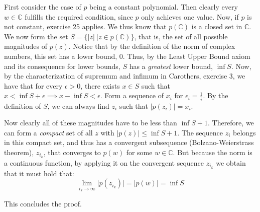 \begin{solution}

    First consider the case of $p$ being a constant polynomial. Then clearly every $w \in \mathbb{C}$ fulfills the required condition, since $p$ only achieves one value. Now, if $p$ is not constant, exercise 25 applies. We thus know that $p(\mathbb{C})$ is a closed set in $\mathbb{C}$. We now form the set $S = \{ \lvert z \rvert \ \rvert z \in p(\mathbb{C})\}$, that is, the set of all possible magnitudes of $p(z)$. Notice that by the definition of the norm of complex numbers, this set has a lower bound, 0. Thus, by the Least Upper Bound axiom and its consequence for lower bounds, $S$ has a \textit{greatest} lower bound, $\inf S$. Now, by the characterization of supremum and infimum in Carothers, exercise 3, we have that for every $\epsilon > 0$, there exists $x \in S$ such that $x < \inf S + \epsilon \implies x- \inf S < \epsilon$. Form a sequence of $x_i$ for $\epsilon_i = \frac{1}{i}$. By the definition of $S$, we can always find $z_i$ such that $\lvert p(z_i) \rvert = x_i$. 
    
    Now clearly all of these magnitudes have to be less than $\inf S + 1$. Therefore, we can form a \textit{compact} set of all $z$ with $\lvert p(z) \rvert \leq \inf S + 1$. The sequence $z_i$ belongs in this compact set, and thus has a convergent subsequence (Bolzano-Weierstrass theorem), $z_{i_k}$, that converges to $p(w)$ for some $w \in \mathbb{C}$. But because the norm is a continuous function, by applying it on the convergent sequence $z_{i_k}$ we obtain that it must hold that:
    $$\lim_{i_k \rightarrow \infty} \lvert p(z_{i_k}) \rvert = \lvert p(w) \rvert = \inf S$$

    This concludes the proof.
\end{solution}

